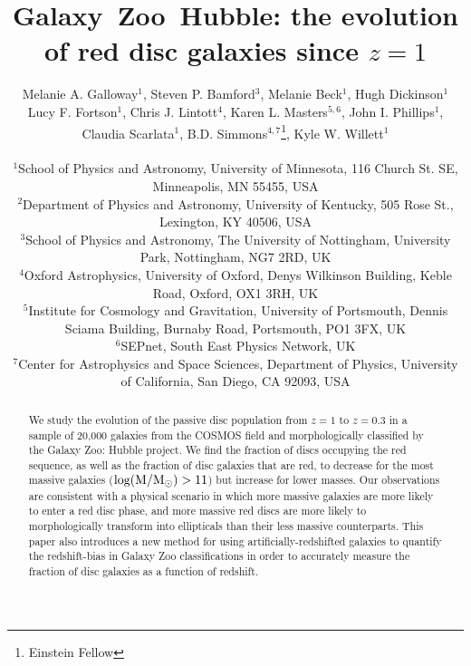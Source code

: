 \documentclass[useAMS,usenatbib]{mn2e}
\begin{document}
\title[Galaxy~Zoo~Hubble: passive red discs]{Galaxy~Zoo~Hubble: the evolution of red disc galaxies since $z=1$}
\author[Galloway et~al.]{\parbox[t]{16cm}{Melanie A. Galloway$^{1}$, Steven P. Bamford$^{3}$, Melanie Beck$^{1}$,
Hugh Dickinson$^{1}$ Lucy F. Fortson$^{1}$, Chris J. Lintott$^{4}$, Karen L. Masters$^{5,6}$, John I. Phillips$^{1}$, Claudia Scarlata$^{1}$,
B.D. Simmons$^{4,7}$\footnote{Einstein Fellow}, Kyle W. Willett$^{1}$
\vspace{0.1in} }\\
$^{1}$School of Physics and Astronomy, University of Minnesota, 116 Church St. SE, Minneapolis, MN 55455, USA \\
$^{2}$Department of Physics and Astronomy, University of Kentucky, 505 Rose St., Lexington, KY 40506, USA \\
$^{3}$School of Physics and Astronomy, The University of Nottingham, University Park, Nottingham, NG7 2RD, UK \\
$^{4}$Oxford Astrophysics, University of Oxford, Denys Wilkinson Building, Keble Road, Oxford, OX1 3RH, UK \\
$^{5}$Institute for Cosmology and Gravitation, University of Portsmouth, Dennis Sciama Building, Burnaby Road, Portsmouth, PO1 3FX, UK \\
$^{6}$SEPnet, South East Physics Network, UK \\
$^{7}$Center for Astrophysics and Space Sciences, Department of Physics, University of California, San Diego, CA 92093, USA \\
   }
\maketitle

\begin{abstract}
We study the evolution of the passive disc population from $z=1$ to $z=0.3$ in a sample of 20,000 galaxies from the COSMOS field and morphologically classified by the Galaxy Zoo: Hubble project. We find the fraction of discs occupying the red sequence, as well as the fraction of disc galaxies that are red, to decrease for the most massive galaxies ($\rm log(M/M_{\odot})>11$) but increase for lower masses. Our observations are consistent with a physical scenario in which more massive galaxies are more likely to enter a red disc phase, and more massive red discs are more likely to morphologically transform into ellipticals than their less massive counterparts. This paper also introduces a new method for using artificially-redshifted galaxies to quantify the redshift-bias in Galaxy Zoo classifications in order to accurately measure the fraction of disc galaxies as a function of redshift.  


\end{abstract}
\end{document}
